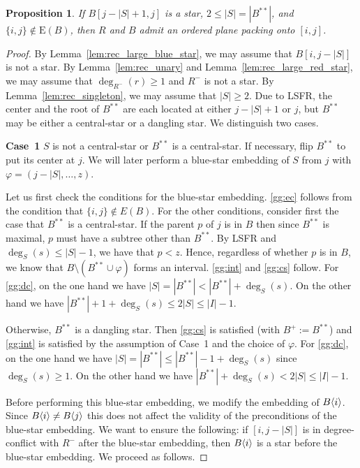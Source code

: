 \documentclass[11pt,a4paper,colorlinks=true,urlcolor=blue,citecolor=red]{article}
\theoremstyle{plain}
\newtheorem{proposition}[theorem]{Proposition}
\newcommand{\case}[1]{\par\vspace{.5\baselineskip}\noindent\textbf{\sffamily Case~#1}}
\newcommand{\EB}{\mathrm{E}(B)}
\begin{document}
\begin{proposition}\label{prop:rec_small_blue_star_equal_ij_not_used}
  If $B[j-|S|+1,j]$ is a star, $2\leq |S|=|B^{**}|$, and
  $\{i,j\}\not\in\EB$, then $R$ and $B$ admit an ordered plane
  packing onto $[i,j]$.
\end{proposition}
\begin{proof}
  By Lemma~\ref{lem:rec_large_blue_star}, we may assume that
  $B[i,j-|S|]$ is not a star. By Lemma~\ref{lem:rec_unary} and
  Lemma~\ref{lem:rec_large_red_star}, we may assume that
  $\deg_{R^-}(r)\geq1$ and $R^-$ is not a star. By
  Lemma~\ref{lem:rec_singleton}, we may assume that $|S|\geq2$. Due to
  LSFR, the center and the root of $B^{**}$ are each located at either
  $j-|S|+1$ or $j$, but $B^{**}$ may be either a central-star or a
  dangling star. We distinguish two cases.

  \case{1} $S$ is not a central-star or $B^{**}$ is a central-star. If
  necessary, flip $B^{**}$ to put its center at $j$. We will later perform a
  blue-star embedding of $S$ from $j$ with $\varphi=(j-|S|,\dots,z)$.

  Let us first check the conditions for the blue-star embedding.
  \ref{gg:ec} follows from the condition that $\{i,j\}\not\in E(B)$.
  For the other conditions, consider first the case that $B^{**}$ is a
  central-star. If the parent $p$ of $j$ is in $B$ then since
  $B^{**}$ is maximal, $p$ must have a subtree other than $B^{**}$. By
  LSFR and $\deg_S(s)\leq|S|-1$, we have that $p<z$. Hence, regardless
  of whether $p$ is in $B$, we know that
  $B\setminus(B^{**}\cup\varphi)$ forms an interval. \ref{gg:int} and
  \ref{gg:cs} follow. For \ref{gg:dc}, on the one hand we have
  $|S|=|B^{**}|<|B^{**}|+\deg_S(s)$. On the other hand we have
  $|B^{**}|+1+\deg_S(s)\leq 2|S|\leq |I|-1$.

  Otherwise, $B^{**}$ is a dangling star. Then \ref{gg:cs} is satisfied
  (with $B^+:=B^{**}$) and \ref{gg:int} is satisfied by the assumption
  of Case~1 and the choice of $\varphi$. For \ref{gg:dc}, on the one hand
  we have $|S|=|B^{**}|\leq|B^{**}|-1+\deg_S(s)$ since $\deg_S(s)\geq1$.
  On the other hand we have $|B^{**}|+\deg_S(s)< 2|S|\leq |I|-1$.

  Before performing this blue-star embedding, we modify the embedding
  of $B\langle{i}\rangle$. Since $B\langle{i}\rangle\neq B\langle{j}\rangle$ this does not affect
  the validity of the preconditions of the blue-star embedding. We
  want to ensure the following: if $[i,j-|S|]$ is in degree-conflict with
  $R^-$ after the blue-star embedding, then $B\langle{i}\rangle$ is a star
  before the blue-star embedding. We proceed as follows.


\end{proof}
\end{document}
